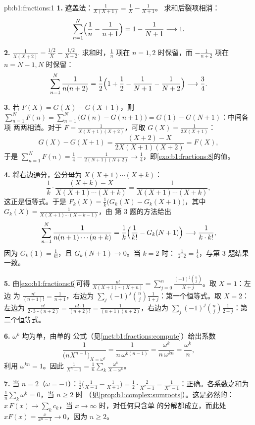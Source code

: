 \begin{solution}{pb:b1:fractions:1}
\textbf{1.} 遮盖法：$\frac1{X(X+1)} = \frac1X - \frac1{X+1}$。
求和后裂项相消：
\[
\sum_{n=1}^{N}\Bigl(\frac1n - \frac1{n+1}\Bigr)
= 1 - \frac1{N+1} \longrightarrow 1 .
\]

\textbf{2.} $\frac1{X(X+2)} = \frac{1/2}X - \frac{1/2}{X+2}$.
求和时，$\frac1n$ 项在 $n = 1, 2$ 时保留，而
$-\frac1{n+2}$ 项在 $n = N-1, N$ 时保留：
\[
\sum_{n=1}^{N}\frac1{n(n+2)}
= \frac12\Bigl(1 + \frac12 - \frac1{N+1} - \frac1{N+2}\Bigr)
\longrightarrow \frac34 .
\]

\textbf{3.} 若 $F(X) = G(X) - G(X+1)$，则 $\sum_{n=1}^N F(n) =
\sum_{n=1}^N\bigl(G(n) - G(n+1)\bigr) = G(1) - G(N+1)$：中间各项
两两相消。对于 $F =
\frac1{X(X+1)(X+2)}$，可取 $G(X) = \frac1{2X(X+1)}$：
\[
G(X) - G(X+1)
= \frac{(X+2) - X}{2X(X+1)(X+2)} = F(X) ,
\]
于是 $\sum_{n=1}^N F(n) = \frac14 - \frac1{2(N+1)(N+2)} \to
\frac14$，即\cref{exo:b1:fractions:8}的值。

\textbf{4.} 将右边通分，公分母为
$X(X+1)\cdots(X+k)$：
\[
\frac1k\cdot\frac{(X + k) - X}{X(X+1)\cdots(X+k)}
= \frac{1}{X(X+1)\cdots(X+k)} ,
\]
这正是恒等式。于是 $F_k(X) = \frac1k\bigl(G_k(X) -
G_k(X+1)\bigr)$，其中 $G_k(X) = \frac1{X(X+1)\cdots(X+k-1)}$，由
第 3 题的方法给出
\[
\sum_{n=1}^{N}\frac1{n(n+1)\cdots(n+k)}
= \frac1k\Bigl(\frac1{k!} - G_k(N+1)\Bigr)
\longrightarrow \frac1{k\cdot k!} ,
\]
因为 $G_k(1) = \frac1{k!}$，且 $G_k(N+1) \to 0$。当 $k = 2$ 时：
$\frac1{2\cdot2} = \frac14$，与第 3 题结果一致。

\textbf{5.} 由\cref{exo:b1:fractions:6}可得
$\frac{n!}{X(X+1)\cdots(X+n)} = \sum_{j=0}^n
\frac{(-1)^j\binom nj}{X + j}$。取 $X = 1$：左边
为 $\frac{n!}{(n+1)!} = \frac1{n+1}$，右边为
$\sum_j(-1)^j\binom nj\frac1{1+j}$：第一个恒等式。取 $X = 2$：
左边为 $\frac{n!}{2\cdot3\cdots(n+2)} =
\frac{n!\cdot1}{(n+2)!} = \frac1{(n+1)(n+2)}$，右边为
$\sum_j(-1)^j\binom nj\frac1{2+j}$：第二个恒等式。

\textbf{6.}  $\omega^k$ 均为单，由单的
公式（见\cref{met:b1:fractions:compute}）给出系数
\[
\frac{1}{\bigl(nX^{n-1}\bigr)_{X = \omega^k}}
= \frac{1}{n\,\omega^{k(n-1)}}
= \frac{\omega^k}{n\,\omega^{kn}} = \frac{\omega^k}n ,
\]
利用 $\omega^{kn} = 1$。因此 $\frac1{X^n-1} = \frac1n\sum_k
\frac{\omega^k}{X - \omega^k}$。

\textbf{7.} 当 $n = 2$（$\omega = -1$）：$\frac12\bigl(
\frac1{X-1} - \frac1{X+1}\bigr) = \frac12\cdot\frac{2}{X^2-1} =
\frac1{X^2-1}$：正确。各系数之和为
$\frac1n\sum_k\omega^k = 0$，当 $n \geq 2$ 时
（见\cref{prop:b1:complex:sumroots}）。这是必然的：$x\,F(x) \to
\sum_k c_k$，当 $x \to \infty$ 时，对任何只含单
的分解都成立，而此处 $xF(x) = \frac{x}{x^n-1} \to 0$，因为 $n \geq
2$。


\end{solution}
